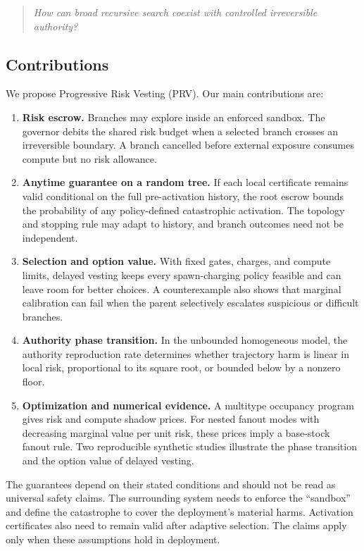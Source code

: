 \documentclass[sigconf,nonacm]{acmart}
\newcommand{\prv}{\textsc{PRV}}
\begin{document}
\begin{quote}
\emph{How can broad recursive search coexist with controlled irreversible authority?}
\end{quote}

\subsection{Contributions}

We propose Progressive Risk Vesting (\prv{}).  Our main contributions are:

\begin{enumerate}
  \item \textbf{Risk escrow.}  Branches may explore inside an enforced sandbox.  The governor
  debits the shared risk budget when a selected branch crosses an irreversible boundary.  A
  branch cancelled before external exposure consumes compute but no risk allowance.
  \item \textbf{Anytime guarantee on a random tree.}  If each local certificate remains valid
  conditional on the full pre-activation history, the root escrow bounds the probability of any
  policy-defined catastrophic activation.  The topology and stopping rule may adapt to history,
  and branch outcomes need not be independent.
  \item \textbf{Selection and option value.}  With fixed gates, charges, and compute limits,
  delayed vesting keeps every spawn-charging policy feasible and can leave room for better
  choices.  A counterexample
  also shows that marginal calibration can fail when the parent selectively escalates suspicious
  or difficult branches.
  \item \textbf{Authority phase transition.}  In the unbounded homogeneous model, the authority
  reproduction rate determines whether trajectory harm is linear in local risk, proportional to
  its square root, or bounded below by a nonzero floor.
  \item \textbf{Optimization and numerical evidence.}  A multitype occupancy program gives risk
  and compute shadow prices.  For nested fanout modes with decreasing marginal value per unit
  risk, these prices imply a base-stock fanout rule.  Two reproducible synthetic studies illustrate
  the phase transition and the option value of delayed vesting.
\end{enumerate}

The guarantees depend on their stated conditions and should not be read as universal safety
claims.  The surrounding system needs to enforce the ``sandbox'' and define the catastrophe to
cover the deployment's material harms.  Activation certificates also need to remain valid after
adaptive selection.  The claims apply only when these assumptions hold in deployment.
\end{document}
